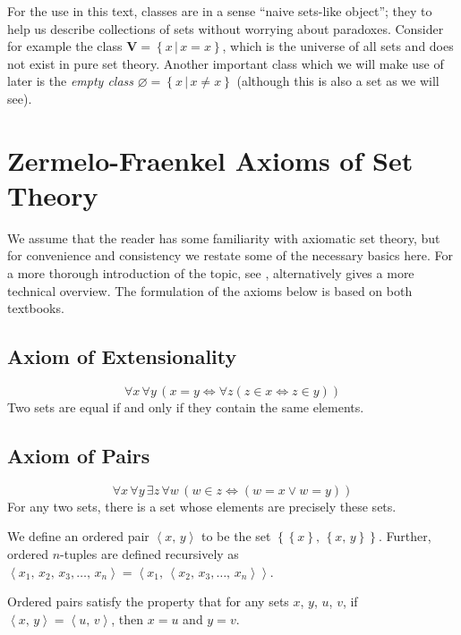 \documentclass[../../main.tex]{subfiles}
\begin{document}
For the use in this text, classes are in a sense ``naive sets-like object''; they to help us describe collections of sets without worrying about paradoxes.
Consider for example the class $\mathbf{V} = \left\{x \,\vert\, x=x\right\}$, which is the universe of all sets and does not exist in pure set theory.
Another important class which we will make use of later is the \textit{empty class} $\varnothing = \left\{x \,\vert\, x \neq x\right\}$ (although this is also a set as we will see).

\section{Zermelo-Fraenkel Axioms of Set Theory}
We assume that the reader has some familiarity with axiomatic set theory, but for convenience and consistency we restate some of the necessary basics here. %
For a more thorough introduction of the topic, see \cite[\S\S 4.3-4.5]{Gol17}, alternatively \cite[\S 1.1]{Jec78} gives a more technical overview.
The formulation of the axioms below is based on both textbooks.

\subsection{Axiom of Extensionality}\label{ZF1}
$$\forall x\, \forall y\, \left(x = y \iff \forall z \left(z \in x \iff z \in y\right) \right)$$
Two sets are equal if and only if they contain the same elements.\cite[\S 4.3, p.76]{Gol17}

\subsection{Axiom of Pairs}\label{ZF2}
$$\forall x\, \forall y\, \exists z\, \forall w\, \left( w \in z \iff \left(w = x \vee w = y \right)\right)$$
For any two sets, there is a set whose elements are precisely these sets.
 
We define an ordered pair $\left<x,\, y\right>$ to be the set $\left\{\left\{x\right\},\, \left\{x,\, y\right\}\right\}$.
Further, ordered $n$-tuples are defined recursively as $\left<x_1,\, x_2,\, x_3,\ldots,\, x_n\right> = \left<x_1,\, \left<x_2,\, x_3,\ldots,\, x_n\right>\right>$.\cite[\S 4.3, pp.76, 79-80]{Gol17}

Ordered pairs satisfy the property that for any sets $x$, $y$, $u$, $v$, if $\left<x,\, y\right> = \left<u,\, v\right>$, then $x = u$ and $y = v$.\cite[Theorem 4.2]{Gol17}
\end{document}
